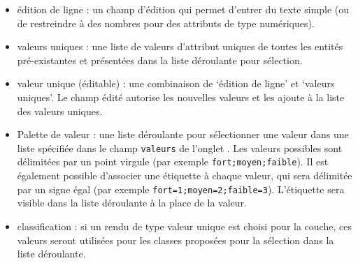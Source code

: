 \begin{itemize}
\item \'edition de ligne : un champ d'\'edition qui permet d'entrer du texte simple (ou de restreindre \`a des nombres pour des attributs de type num\'eriques).
\item valeurs uniques : une liste de valeurs d'attribut uniques de toutes les entit\'es pr\'e-existantes et pr\'esent\'ees dans la liste d\'eroulante pour s\'election.
\item valeur unique (\'editable) : une combinaison de `\'edition de ligne' et `valeurs uniques'. Le champ \'edit\'e autorise les nouvelles valeurs et les ajoute \`a la liste des valeurs uniques.
\item Palette de valeur : une liste d\'eroulante pour s\'electionner une valeur dans une liste sp\'ecifi\'ee dans le champ \texttt{valeurs} de l'onglet . Les valeurs possibles sont d\'elimit\'ees par un point virgule (par exemple \verb|fort;moyen;faible|). Il est \'egalement possible d'associer une \'etiquette \`a chaque valeur, qui sera d\'elimit\'ee par un signe \'egal (par exemple \verb|fort=1;moyen=2;faible=3|). L'\'etiquette sera visible dans la liste d\'eroulante \`a la place de la valeur.
\item classification :  si un rendu de type valeur unique est choisi pour la couche, ces valeurs seront utilis\'ees pour les classes propos\'ees pour la s\'election dans la liste d\'eroulante.

\end{itemize}
